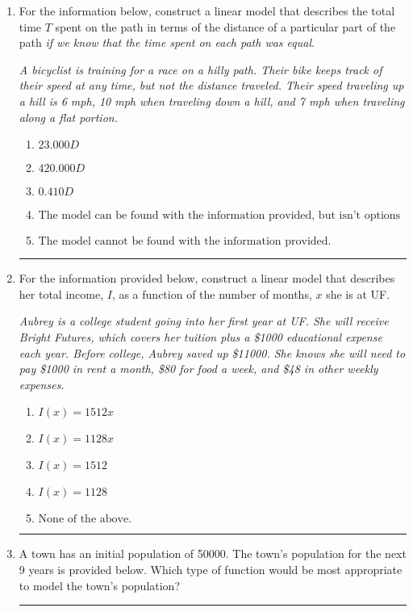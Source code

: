 \documentclass[14pt]{extbook}
\newcommand{\litem}[1]{\item#1\hspace*{-1cm}\rule{\textwidth}{0.4pt}}
\begin{document}
\begin{enumerate}
\litem{
For the information below, construct a linear model that describes the total time $T$ spent on the path in terms of the distance of a particular part of the path \textit{if we know that the time spent on each path was equal}.
\begin{center}
    \textit{ A bicyclist is training for a race on a hilly path. Their bike keeps track of their speed at any time, but not the distance traveled. Their speed traveling up a hill is 6 mph, 10 mph when traveling down a hill, and 7 mph when traveling along a flat portion. }
\end{center}
\begin{enumerate}[label=\Alph*.]
\item \( 23.000 D \)
\item \( 420.000 D \)
\item \( 0.410 D \)
\item \( \text{The model can be found with the information provided, but isn't options 1-3.} \)
\item \( \text{The model cannot be found with the information provided.} \)

\end{enumerate} }
\litem{
For the information provided below, construct a linear model that describes her total income, $I$, as a function of the number of months, $x$ she is at UF.
\begin{center}
    \textit{ Aubrey is a college student going into her first year at UF. She will receive Bright Futures, which covers her tuition plus a \$1000 educational expense each year. Before college, Aubrey saved up \$11000. She knows she will need to pay \$1000 in rent a month, \$80 for food a week, and \$48 in other weekly expenses. }
\end{center}
\begin{enumerate}[label=\Alph*.]
\item \( I(x) = 1512 x \)
\item \( I(x) = 1128 x \)
\item \( I(x) = 1512 \)
\item \( I(x) = 1128 \)
\item \( \text{None of the above.} \)

\end{enumerate} }
\litem{
A town has an initial population of 50000. The town's population for the next 9 years is provided below. Which type of function would be most appropriate to model the town's population?

}
\end{enumerate}
\end{document}
